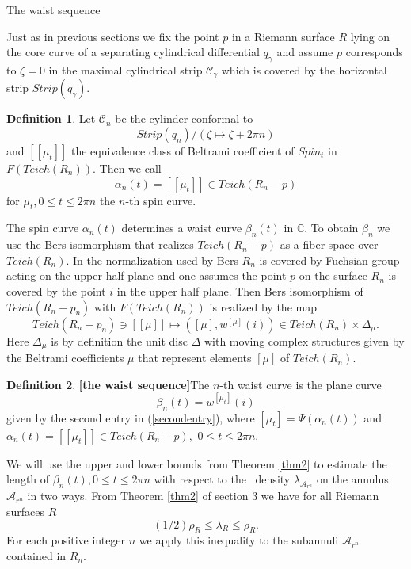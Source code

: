 \documentclass[12pt]{amsart}
\theoremstyle{remark}
\theoremstyle{definition}
\newtheorem{definition}{Definition}
\theoremstyle{definition}
\begin{document}
    
\begin{section}{The waist sequence}\label{lengthofhs}


 Just as in previous sections we fix the point $p$ in a Riemann surface  $R$ lying on the 
 core curve of a separating cylindrical differential $q_{\gamma}$ and assume $p$ 
 corresponds to $\zeta=0$ in the maximal cylindrical strip ${\mathcal C}_{\gamma}$ 
 which is covered by the  horizontal strip $Strip(q_{\gamma}).$    \begin{definition}\label{dfnalpha} Let   
 ${\mathcal C}_n$ be the cylinder conformal to 
 $$Strip(q_n)/(\zeta \mapsto \zeta + 2 \pi n)$$
 and $[[\mu_t]]$ the equivalence class of Beltrami coefficient of $Spin_t$ in 
 $F(Teich(R_n)).$
 Then we call $$\alpha_n(t)=[[\mu_t]] \in Teich(R_n-p)$$ 
  for $\mu_t, 0 \leq t \leq 2 \pi n$ the $n$-th spin curve.  
  \end{definition}
    
  
 The spin curve $\alpha_n(t)$ determines a waist curve $\beta_n(t)$ in ${\mathbb C}.$   To obtain $\beta_n$ we  use the Bers isomorphism that realizes 
 $Teich(R_n-p)$ as a fiber space  over $Teich(R_n).$  In the normalization used by Bers $R_n$ is covered by Fuchsian group acting on the upper half plane and one assumes the point $p$ on the surface $R_n$ is covered by the point $i$ in the upper half plane.  Then Bers isomorphism of $Teich(R_n-p_n)$ with $F(Teich(R_n))$  is realized  by the map 
  \begin{equation}\label{secondentry}Teich(R_n-p_n) \ni [[\mu]] \mapsto \left([\mu], w^{[\mu]}(i)\right) \in Teich(R_n) \times \Delta_{\mu}. 
 \end{equation}
 Here $\Delta_{\mu}$ is by definition the unit disc $\Delta$ with moving complex structures given by the Beltrami coefficients $\mu$ that represent elements $[\mu]$ of $Teich(R_n).$
 
 
 \begin{definition}{\bf [the waist sequence]}\label{hs} The $n$-th  waist curve is the plane curve 
 $$\beta_n(t) = w^{[\mu_t]}(i)$$
 given by the second entry in (\ref{secondentry}), where $[\mu_t] = \Psi(\alpha_n(t))$ and 
 $\alpha_n(t)=[[\mu_t]] \in Teich(R_n-p),$ $0 \leq t \leq 2 \pi n.$
 \end{definition}
   We will use the upper and lower bounds from   
  Theorem \ref{thm2}  to estimate the length of $\beta_n(t), 0 \leq t \leq 2 \pi n$ with respect to the \te\ density $\lambda_{{\mathcal A}_{r^n}}$ on the annulus ${\mathcal A}_{r^n}$ in two ways. 
  From Theorem \ref{thm2} of section 3 we have for all Riemann surfaces $R$
  \begin{equation}\label{first}
  (1/2) \rho_R \leq \lambda_R \leq \rho_R.
   \end{equation}
      For each positive integer $n$ we apply this inequality to the subannuli ${\mathcal A}_{r^n}$ contained in $R_n.$


\end{section}
\end{document}
